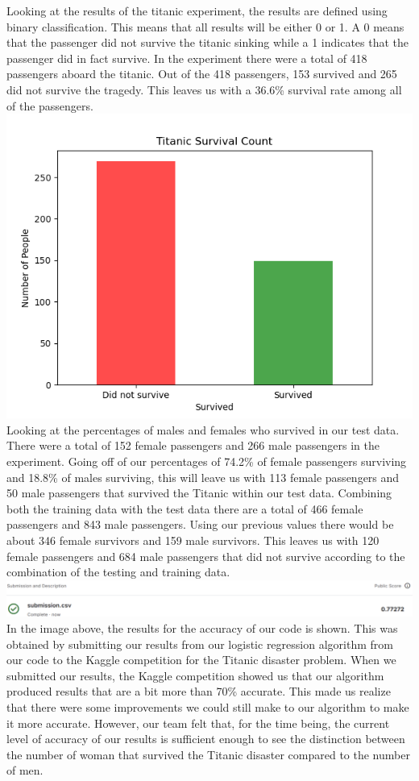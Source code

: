 \documentclass{IEEE}
\begin{document}
Looking at the results of the titanic experiment, the results are defined using binary classification. This means that all results will be either 0 or 1. A 0 means that the passenger did not survive the titanic sinking while a 1 indicates that the passenger did in fact survive. In the experiment there were a total of 418 passengers aboard the titanic. Out of the 418 passengers, 153 survived and 265 did not survive the tragedy. This leaves us with a 36.6\% survival rate among all of the passengers.
\includegraphics[scale=0.54]{./barchart2}
Looking at the percentages of males and females who survived in our test data. There were a total of 152 female passengers and 266 male passengers in the experiment. Going off of our percentages of 74.2\% of female passengers surviving and 18.8\% of males surviving, this will leave us with 113 female passengers and 50 male passengers that survived the Titanic within our test data. Combining both the training data with the test data there are a total of 466 female passengers and 843 male passengers. Using our previous values there would be about 346 female survivors and 159 male survivors. This leaves us with 120 female passengers and 684 male passengers that did not survive according to the combination of the testing and training data.
\includegraphics[scale=0.215]{./results.png}
In the image above, the results for the accuracy of our code is shown. This was obtained by submitting our results from our logistic regression algorithm from our code to the Kaggle competition for the Titanic disaster problem. When we submitted our results, the Kaggle competition showed us that our algorithm produced results that are a bit more than 70\% accurate. This made us realize that there were some improvements we could still make to our algorithm to make it more accurate. However, our team felt that, for the time being, the current level of accuracy of our results is sufficient enough to see the distinction between the number of woman that survived the Titanic disaster compared to the number of men.
\end{document}
